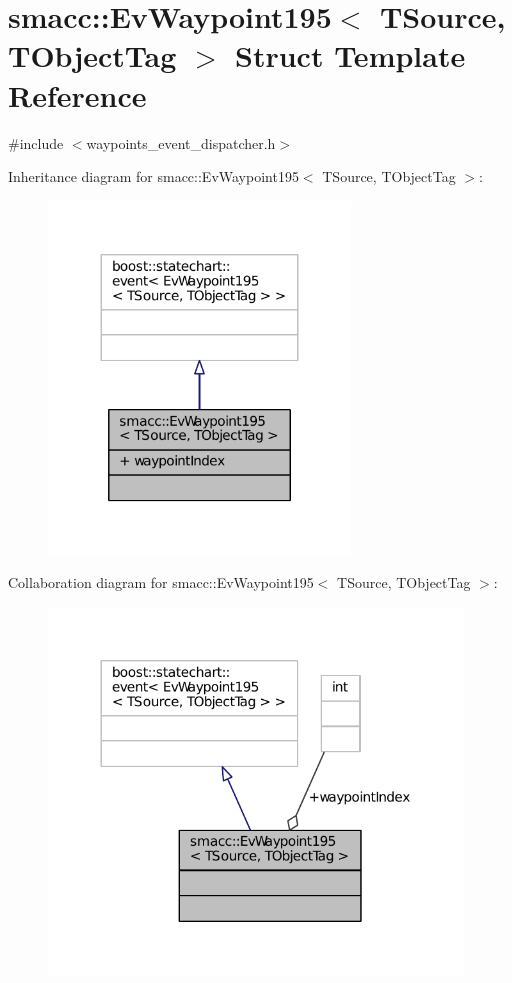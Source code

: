 \hypertarget{structsmacc_1_1EvWaypoint195}{}\section{smacc\+:\+:Ev\+Waypoint195$<$ T\+Source, T\+Object\+Tag $>$ Struct Template Reference}
\label{structsmacc_1_1EvWaypoint195}


{\ttfamily \#include $<$waypoints\+\_\+event\+\_\+dispatcher.\+h$>$}



Inheritance diagram for smacc\+:\+:Ev\+Waypoint195$<$ T\+Source, T\+Object\+Tag $>$\+:
\nopagebreak
\begin{figure}[H]
\begin{center}
\leavevmode
\includegraphics[width=227pt]{structsmacc_1_1EvWaypoint195__inherit__graph}
\end{center}
\end{figure}


Collaboration diagram for smacc\+:\+:Ev\+Waypoint195$<$ T\+Source, T\+Object\+Tag $>$\+:
\nopagebreak
\begin{figure}[H]
\begin{center}
\leavevmode
\includegraphics[width=312pt]{structsmacc_1_1EvWaypoint195__coll__graph}
\end{center}
\end{figure}
